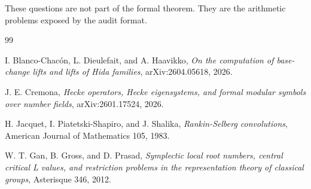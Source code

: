 \documentclass[11pt]{article}
\begin{document}
These questions are not part of the formal theorem.  They are the arithmetic problems exposed by the audit format.

\begin{thebibliography}{99}

I. Blanco-Chacón, L. Dieulefait, and A. Haavikko,
\emph{On the computation of base-change lifts and lifts of Hida families},
arXiv:2604.05618, 2026.

J. E. Cremona,
\emph{Hecke operators, Hecke eigensystems, and formal modular symbols over number fields},
arXiv:2601.17524, 2026.

H. Jacquet, I. Piatetski-Shapiro, and J. Shalika,
\emph{Rankin-Selberg convolutions},
American Journal of Mathematics 105, 1983.

W. T. Gan, B. Gross, and D. Prasad,
\emph{Symplectic local root numbers, central critical L values, and restriction problems in the representation theory of classical groups},
Asterisque 346, 2012.

\end{thebibliography}
\end{document}
